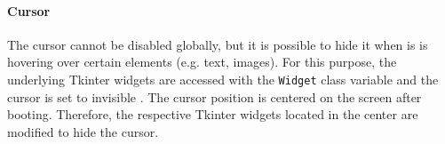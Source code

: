 \paragraph{Cursor}
The cursor cannot be disabled globally, but it is possible to hide it when is is hovering over certain elements (e.g. text, images).
For this purpose, the underlying Tkinter widgets are accessed with the \texttt{Widget} class variable and the cursor is set to invisible \cite{}. %
The cursor position is centered on the screen after booting.
Therefore, the respective Tkinter widgets located in the center are modified to hide the cursor.
